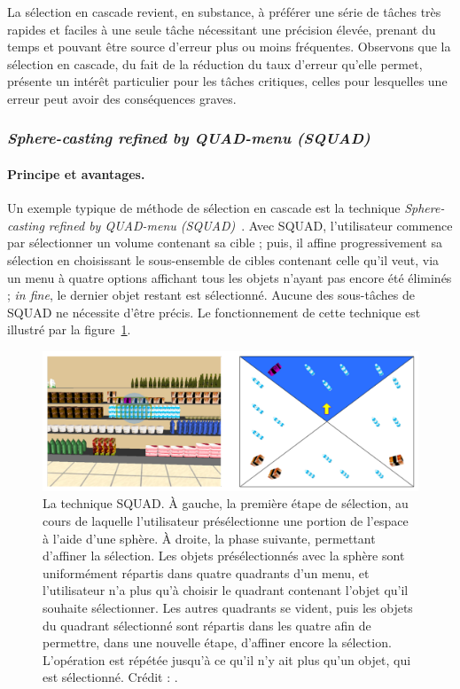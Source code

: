 	La sélection en cascade revient, en substance, à préférer une série de tâches très rapides et faciles à une seule tâche nécessitant une précision élevée, prenant du temps et pouvant être source d'erreur plus ou moins fréquentes. Observons que la sélection en cascade, du fait de la réduction du taux d'erreur qu'elle permet, présente un intérêt particulier pour les tâches critiques, celles pour lesquelles une erreur peut avoir des conséquences graves.
	
	\subsubsection{\emph{Sphere-casting refined by QUAD-menu
(SQUAD)}}
	\paragraph{Principe et avantages.}	 
	Un exemple typique de méthode de sélection en cascade est la technique \emph{Sphere-casting refined by QUAD-menu
(SQUAD)}~\cite{kopper2011rapid}. Avec SQUAD, l'utilisateur commence par sélectionner un volume contenant sa cible ; puis, il affine progressivement sa sélection en choisissant le sous-ensemble de cibles contenant celle qu'il veut, via un menu à quatre options affichant tous les objets n'ayant pas encore été éliminés ; \emph{in fine}, le dernier objet restant est sélectionné. Aucune des sous-tâches de SQUAD ne nécessite d'être précis. Le fonctionnement de cette technique est illustré par la figure~\ref{fig:squad}.

	\begin{figure}[H]
		\centering
		\includegraphics[width=\textwidth]{figures/ch2/squad}
		\caption[Fonctionnement de la technique SQUAD]{La technique SQUAD. À gauche, la première étape de sélection, au cours de laquelle l'utilisateur présélectionne une portion de l'espace à l'aide d'une sphère. À droite, la phase suivante, permettant d'affiner la sélection. Les objets présélectionnés avec la sphère sont uniformément répartis dans quatre quadrants d'un menu, et l'utilisateur n'a plus qu'à choisir le quadrant contenant l'objet qu'il souhaite sélectionner. Les autres quadrants se vident, puis les objets du quadrant sélectionné sont répartis dans les quatre afin de permettre, dans une nouvelle étape, d'affiner encore la sélection. L'opération est répétée jusqu'à ce qu'il n'y ait plus qu'un objet, qui est sélectionné. Crédit : \cite{kopper2011rapid}.}
		\label{fig:squad}
	\end{figure}
	
